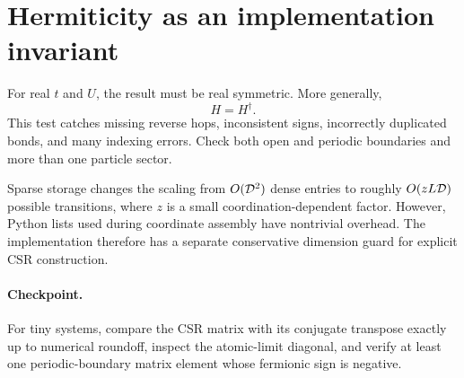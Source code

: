 

\section{Hermiticity as an implementation invariant}

For real $t$ and $U$, the result must be real symmetric.  More generally,
\begin{equation}
H=H^\dagger.
\end{equation}
This test catches missing reverse hops, inconsistent signs, incorrectly
duplicated bonds, and many indexing errors.  Check both open and periodic
boundaries and more than one particle sector.

Sparse storage changes the scaling from $O(\mathcal{D}^2)$ dense entries to
roughly $O(zL\mathcal{D})$ possible transitions, where $z$ is a small
coordination-dependent factor.  However, Python lists used during coordinate
assembly have nontrivial overhead.  The implementation therefore has a
separate conservative dimension guard for explicit CSR construction.

\paragraph{Checkpoint.}
For tiny systems, compare the CSR matrix with its conjugate transpose exactly
up to numerical roundoff, inspect the atomic-limit diagonal, and verify at
least one periodic-boundary matrix element whose fermionic sign is negative.

